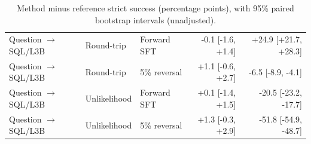 \begin{table}[t]
\begin{tabular}{lllrr}
Question $\to$ SQL/L3B & Round-trip & Forward SFT & -0.1 [-1.6, +1.4] & +24.9 [+21.7, +28.3] \\
Question $\to$ SQL/L3B & Round-trip & 5\% reversal & +1.1 [-0.6, +2.7] & -6.5 [-8.9, -4.1] \\
Question $\to$ SQL/L3B & Unlikelihood & Forward SFT & +0.1 [-1.4, +1.5] & -20.5 [-23.2, -17.7] \\
Question $\to$ SQL/L3B & Unlikelihood & 5\% reversal & +1.3 [-0.3, +2.9] & -51.8 [-54.9, -48.7] \\
\bottomrule\end{tabular}
\caption{Method minus reference strict success (percentage points), with 95\% paired bootstrap intervals (unadjusted).}\label{tab:auxiliary-intervals}\end{table}
